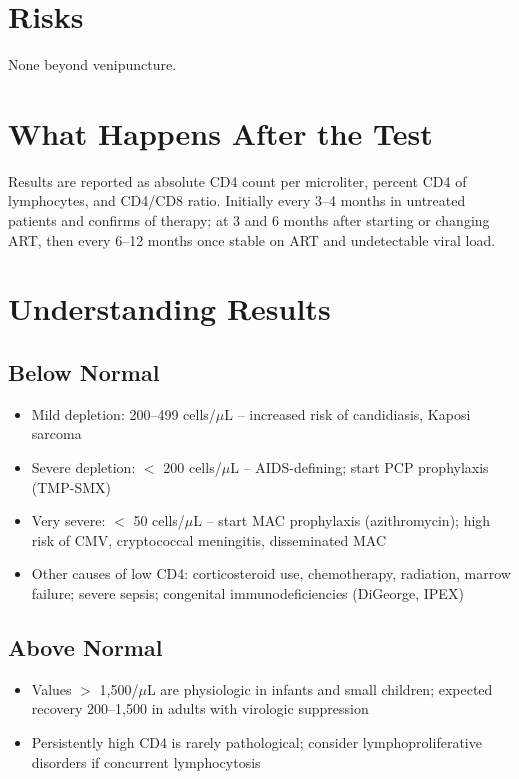 \section*{Risks}
None beyond venipuncture.

\section*{What Happens After the Test}
Results are reported as absolute CD4 count per microliter, percent CD4 of lymphocytes, and CD4/CD8 ratio. Initially every 3--4 months in untreated patients and confirms of therapy; at 3 and 6 months after starting or changing ART, then every 6--12 months once stable on ART and undetectable viral load.

\section*{Understanding Results}

\subsection*{Below Normal}
\begin{itemize}
  \item Mild depletion: 200--499 cells/$\mu$L -- increased risk of candidiasis, Kaposi sarcoma
  \item Severe depletion: $<$ 200 cells/$\mu$L -- AIDS-defining; start PCP prophylaxis (TMP-SMX)
  \item Very severe: $<$ 50 cells/$\mu$L -- start MAC prophylaxis (azithromycin); high risk of CMV, cryptococcal meningitis, disseminated MAC
  \item Other causes of low CD4: corticosteroid use, chemotherapy, radiation, marrow failure; severe sepsis; congenital immunodeficiencies (DiGeorge, IPEX)
\end{itemize}

\subsection*{Above Normal}
\begin{itemize}
  \item Values $>$ 1,500/$\mu$L are physiologic in infants and small children; expected recovery 200--1,500 in adults with virologic suppression
  \item Persistently high CD4 is rarely pathological; consider lymphoproliferative disorders if concurrent lymphocytosis
\end{itemize}

